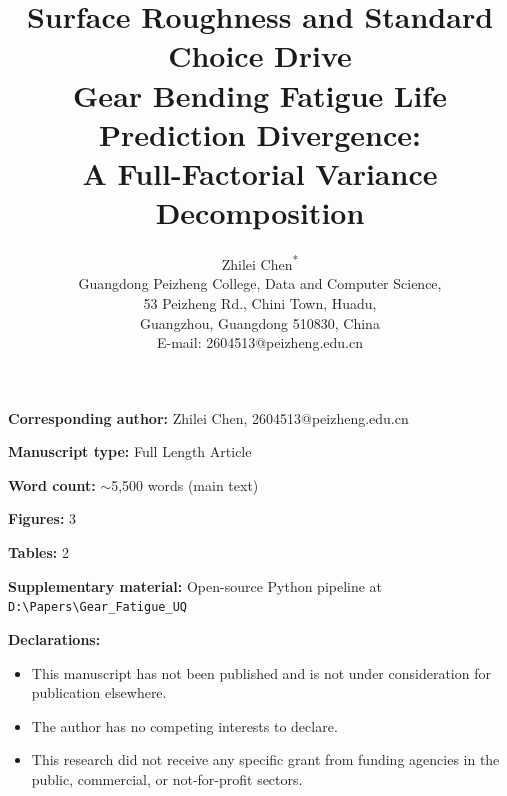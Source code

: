\documentclass[12pt,a4paper]{article}
\begin{document}
\title{\textbf{Surface Roughness and Standard Choice Drive\\
Gear Bending Fatigue Life Prediction Divergence:\\
A Full-Factorial Variance Decomposition}}

\author{Zhilei Chen\textsuperscript{*} \\
Guangdong Peizheng College, Data and Computer Science,\\
53 Peizheng Rd., Chini Town, Huadu,\\
Guangzhou, Guangdong 510830, China\\
E-mail: 2604513@peizheng.edu.cn}

\maketitle

\noindent\textbf{Corresponding author:} Zhilei Chen, 2604513@peizheng.edu.cn

\noindent\textbf{Manuscript type:} Full Length Article

\noindent\textbf{Word count:} $\sim$5,500 words (main text)

\noindent\textbf{Figures:} 3

\noindent\textbf{Tables:} 2

\noindent\textbf{Supplementary material:} Open-source Python pipeline at
\texttt{D:\textbackslash Papers\textbackslash Gear\_Fatigue\_UQ}

\noindent\textbf{Declarations:}
\begin{itemize}
  \item This manuscript has not been published and is not under
        consideration for publication elsewhere.
  \item The author has no competing interests to declare.
  \item This research did not receive any specific grant from funding
        agencies in the public, commercial, or not-for-profit sectors.
\end{itemize}
\end{document}
